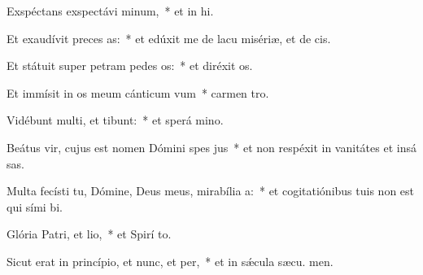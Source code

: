 \item Exspéctans exspectávi minum,~* et in hi.
\item Et exaudívit preces as:~* et edúxit me de lacu misériæ, et de  cis.
\item Et státuit super petram pedes os:~* et diréxit  os.
\item Et immísit in os meum cánticum vum~* carmen  tro.
\item Vidébunt multi, et tibunt:~* et sperá  mino.
\item Beátus vir, cujus est nomen Dómini spes jus~* et non respéxit in vanitátes et insá sas.
\item Multa fecísti tu, Dómine, Deus meus, mirabília a:~* et cogitatiónibus tuis non est qui sími  bi.
\item Glória Patri, et lio,~* et Spirí to.
\item Sicut erat in princípio, et nunc, et per,~* et in sǽcula sæcu. men.
